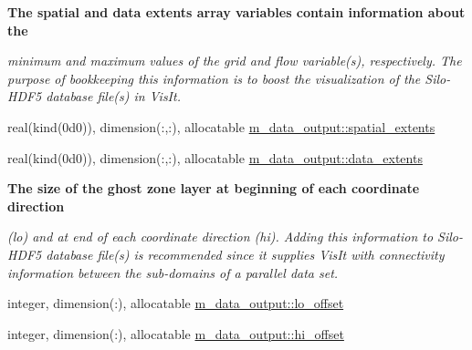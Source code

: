 \begin{Indent}\textbf{ The spatial and data extents array variables contain information about the}\par
{\em minimum and maximum values of the grid and flow variable(s), respectively. The purpose of bookkeeping this information is to boost the visualization of the Silo-\/\+H\+D\+F5 database file(s) in Vis\+It. }\begin{DoxyCompactItemize}
\item 
real(kind(0d0)), dimension(\+:,\+:), allocatable \hyperlink{namespacem__data__output_a20a29bb6bd9724b83d4abab91f1b99a3}{m\+\_\+data\+\_\+output\+::spatial\+\_\+extents}
\item 
real(kind(0d0)), dimension(\+:,\+:), allocatable \hyperlink{namespacem__data__output_a10cecf686032e4df4cd0b9835b159d07}{m\+\_\+data\+\_\+output\+::data\+\_\+extents}
\end{DoxyCompactItemize}
\end{Indent}
\begin{Indent}\textbf{ The size of the ghost zone layer at beginning of each coordinate direction}\par
{\em (lo) and at end of each coordinate direction (hi). Adding this information to Silo-\/\+H\+D\+F5 database file(s) is recommended since it supplies Vis\+It with connectivity information between the sub-\/domains of a parallel data set. }\begin{DoxyCompactItemize}
\item 
integer, dimension(\+:), allocatable \hyperlink{namespacem__data__output_a4b7e6567b3bb7fdd4384180d1a7475af}{m\+\_\+data\+\_\+output\+::lo\+\_\+offset}
\item 
integer, dimension(\+:), allocatable \hyperlink{namespacem__data__output_a1a779679774e1161511609f18e8d9c27}{m\+\_\+data\+\_\+output\+::hi\+\_\+offset}
\end{DoxyCompactItemize}
\end{Indent}
